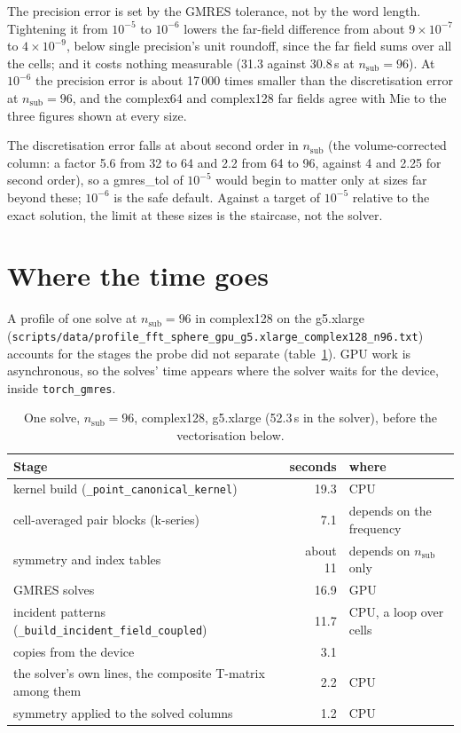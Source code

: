 \documentclass[11pt,a4paper]{article}
\newcommand{\nsub}{n_{\mathrm{sub}}}
\newcommand{\code}[1]{\nolinkurl{#1}}
\begin{document}
The precision error is set by the GMRES tolerance, not by the word length. Tightening it from $10^{-5}$ to $10^{-6}$
lowers the far-field difference from about $9\times10^{-7}$ to $4\times10^{-9}$, below single precision's unit
roundoff, since the far field sums over all the cells; and it costs nothing measurable (31.3 against 30.8\,s at
$\nsub = 96$). At $10^{-6}$ the precision error is about 17\,000 times smaller than the discretisation error at
$\nsub = 96$, and the complex64 and complex128 far fields agree with Mie to the three figures shown at every size.

The discretisation error falls at about second order in $\nsub$ (the volume-corrected column: a factor 5.6 from 32 to
64 and 2.2 from 64 to 96, against 4 and 2.25 for second order), so a gmres\_tol of $10^{-5}$ would begin to matter
only at sizes far beyond these; $10^{-6}$ is the safe default. Against a target of $10^{-5}$ relative to the exact
solution, the limit at these sizes is the staircase, not the solver.

\section{Where the time goes}\label{sec:profile}

A profile of one solve at $\nsub = 96$ in complex128 on the g5.xlarge
(\code{scripts/data/profile_fft_sphere_gpu_g5.xlarge_complex128_n96.txt}) accounts for the stages the probe
did not separate (table~\ref{tab:profile}). GPU work is asynchronous, so the solves' time appears where the solver
waits for the device, inside \code{torch_gmres}.

\begin{table}[h]
\centering
\caption{One solve, $\nsub = 96$, complex128, g5.xlarge (52.3\,s in the solver), before the vectorisation below.}
\label{tab:profile}
\small
\begin{tabular}{lrl}
\toprule
Stage & seconds & where \\
\midrule
kernel build (\code{_point_canonical_kernel}) & 19.3 & CPU \\
\quad cell-averaged pair blocks (k-series) & 7.1 & \quad depends on the frequency \\
\quad symmetry and index tables & about 11 & \quad depends on $\nsub$ only \\
GMRES solves & 16.9 & GPU \\
incident patterns (\code{_build_incident_field_coupled}) & 11.7 & CPU, a loop over cells \\
copies from the device & 3.1 & \\
the solver's own lines, the composite T-matrix among them & 2.2 & CPU \\
symmetry applied to the solved columns & 1.2 & CPU \\
\bottomrule
\end{tabular}
\end{table}
\end{document}
